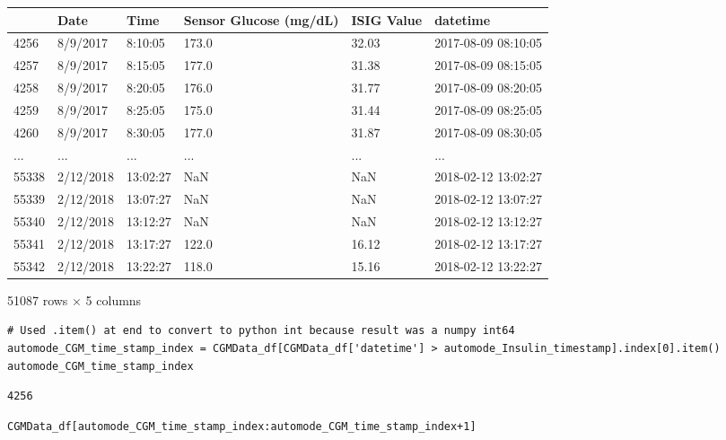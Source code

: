 \bigskip\noindent
\begin{tabular}{p{}p{}p{}p{}p{}p{}}
\toprule
 & Date & Time & Sensor Glucose (mg/dL) & ISIG Value & datetime \\
\hline
4256 & 8/9/2017 & 8:10:05 & 173.0 & 32.03 & 2017-08-09 08:10:05 \\
\hline
4257 & 8/9/2017 & 8:15:05 & 177.0 & 31.38 & 2017-08-09 08:15:05 \\
\hline
4258 & 8/9/2017 & 8:20:05 & 176.0 & 31.77 & 2017-08-09 08:20:05 \\
\hline
4259 & 8/9/2017 & 8:25:05 & 175.0 & 31.44 & 2017-08-09 08:25:05 \\
\hline
4260 & 8/9/2017 & 8:30:05 & 177.0 & 31.87 & 2017-08-09 08:30:05 \\
\hline
... & ... & ... & ... & ... & ... \\
\hline
55338 & 2/12/2018 & 13:02:27 & NaN & NaN & 2018-02-12 13:02:27 \\
\hline
55339 & 2/12/2018 & 13:07:27 & NaN & NaN & 2018-02-12 13:07:27 \\
\hline
55340 & 2/12/2018 & 13:12:27 & NaN & NaN & 2018-02-12 13:12:27 \\
\hline
55341 & 2/12/2018 & 13:17:27 & 122.0 & 16.12 & 2018-02-12 13:17:27 \\
\hline
55342 & 2/12/2018 & 13:22:27 & 118.0 & 15.16 & 2018-02-12 13:22:27 \\
\hline
\bottomrule
\end{tabular}

\bigskip

51087 rows $\times$ 5 columns

\begin{verbatim}
# Used .item() at end to convert to python int because result was a numpy int64
automode_CGM_time_stamp_index = CGMData_df[CGMData_df['datetime'] > automode_Insulin_timestamp].index[0].item()
automode_CGM_time_stamp_index
\end{verbatim}

\begin{verbatim}
4256
\end{verbatim}

\begin{verbatim}
CGMData_df[automode_CGM_time_stamp_index:automode_CGM_time_stamp_index+1]
\end{verbatim}


